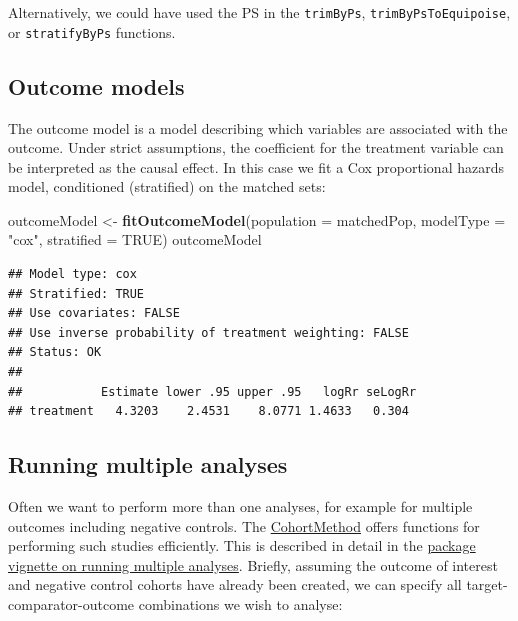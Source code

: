 \documentclass[11pt]{book}
\newenvironment{Shaded}{\begin{snugshade}}{\end{snugshade}}
\newcommand{\DataTypeTok}[1]{\textcolor[rgb]{0.13,0.29,0.53}{#1}}
\newcommand{\KeywordTok}[1]{\textcolor[rgb]{0.13,0.29,0.53}{\textbf{#1}}}
\newcommand{\NormalTok}[1]{#1}
\newcommand{\OtherTok}[1]{\textcolor[rgb]{0.56,0.35,0.01}{#1}}
\newcommand{\StringTok}[1]{\textcolor[rgb]{0.31,0.60,0.02}{#1}}
\theoremstyle{definition}
\theoremstyle{definition}
\theoremstyle{definition}
\theoremstyle{remark}
\begin{document}
Alternatively, we could have used the PS in the \texttt{trimByPs}, \texttt{trimByPsToEquipoise}, or \texttt{stratifyByPs} functions.

\hypertarget{outcome-models}{%
\subsection{Outcome models}\label{outcome-models}}

The outcome model is a model describing which variables are associated with the outcome. Under strict assumptions, the coefficient for the treatment variable can be interpreted as the causal effect. In this case we fit a Cox proportional hazards model, conditioned (stratified) on the matched sets:

\begin{Shaded}
\begin{Highlighting}[]
\NormalTok{outcomeModel <-}\StringTok{ }\KeywordTok{fitOutcomeModel}\NormalTok{(}\DataTypeTok{population =}\NormalTok{ matchedPop,}
                                \DataTypeTok{modelType =} \StringTok{"cox"}\NormalTok{,}
                                \DataTypeTok{stratified =} \OtherTok{TRUE}\NormalTok{)}
\NormalTok{outcomeModel}
\end{Highlighting}
\end{Shaded}

\begin{verbatim}
## Model type: cox
## Stratified: TRUE
## Use covariates: FALSE
## Use inverse probability of treatment weighting: FALSE
## Status: OK
## 
##           Estimate lower .95 upper .95   logRr seLogRr
## treatment   4.3203    2.4531    8.0771 1.4633   0.304
\end{verbatim}

\hypertarget{MultipleAnalyses}{%
\subsection{Running multiple analyses}\label{MultipleAnalyses}}

Often we want to perform more than one analyses, for example for multiple outcomes including negative controls. The \href{https://ohdsi.github.io/CohortMethod/}{CohortMethod} offers functions for performing such studies efficiently. This is described in detail in the \href{https://ohdsi.github.io/CohortMethod/articles/MultipleAnalyses.html}{package vignette on running multiple analyses}. Briefly, assuming the outcome of interest and negative control cohorts have already been created, we can specify all target-comparator-outcome combinations we wish to analyse:
\end{document}
